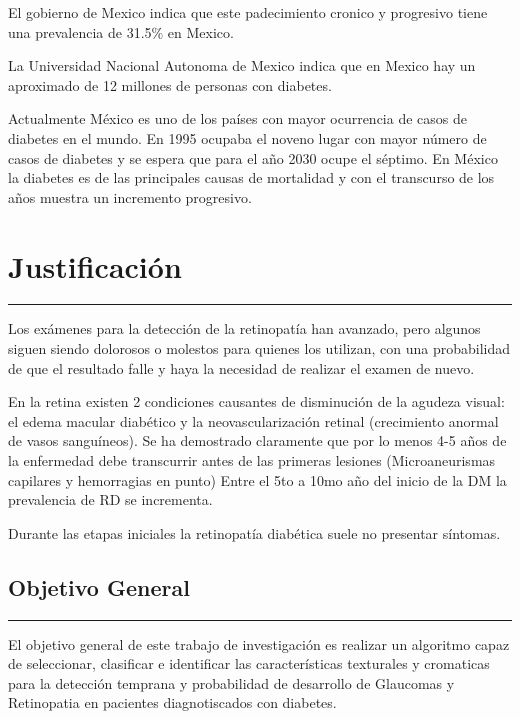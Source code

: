 \documentclass[12pt,letterpaper]{article}
\begin{document}
El gobierno de Mexico indica que este padecimiento cronico y progresivo tiene una prevalencia de 31.5\% en Mexico.

La Universidad Nacional Autonoma de Mexico indica que en Mexico hay un aproximado de 12 millones de personas con diabetes.

Actualmente México es uno de los países con mayor ocurrencia de casos de diabetes en el mundo. En 1995 ocupaba el noveno lugar con mayor número de casos de diabetes y se espera que para el año 2030 ocupe el séptimo\cite{Mexico.Estudio2011}. En México la diabetes es de las principales causas de mortalidad y con el transcurso de los años muestra un incremento progresivo.
\bigskip


	\section{Justificación}
	\hrule


Los exámenes para la detección de la retinopatía han avanzado, pero algunos siguen siendo dolorosos o molestos para quienes los utilizan, con una probabilidad de que el resultado falle y haya la necesidad de realizar el examen de nuevo.

En la retina existen 2 condiciones causantes de disminución de la agudeza visual: el edema macular diabético y la neovascularización retinal (crecimiento anormal de vasos sanguíneos). Se ha demostrado claramente que por lo menos 4-5 años de la enfermedad debe transcurrir antes de las primeras lesiones (Microaneurismas capilares y hemorragias en punto) Entre el 5to a 10mo año del inicio de la DM la prevalencia de RD se incrementa.\cite{CONAMED}


Durante las etapas iniciales la retinopatía diabética  suele no presentar síntomas.

\begin{center}
	\section{Objetivo General}
	\hrule
\end{center}

El objetivo general de este trabajo de investigación es realizar un algoritmo capaz de seleccionar, clasificar e identificar las características texturales y cromaticas para la detección temprana y probabilidad de desarrollo de Glaucomas y Retinopatia en pacientes diagnotiscados con diabetes.

\newpage



\newpage




\newpage
\end{document}

